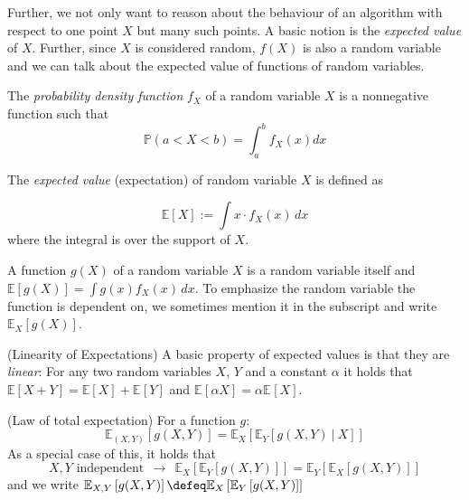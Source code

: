 \documentclass[
    a4paper, %
	fontsize=10pt, %
	twoside=false, %
]{kaobook}
\begin{document}
Further, we not only want to reason about the behaviour of an algorithm with respect to one point $X$ but many such points. A basic notion is the \textit{expected value} of $X$. Further, since $X$ is considered random, $f(X)$ is also a random variable and we can talk about the expected value of functions of random variables.
\begin{definition}
  The \textit{probability density function} $f_X$ of a random variable $X$ is a
  nonnegative function such that
  $$
  \mathbb{P}(a < X < b) = \int_a^b f_X(x) dx
  $$
\end{definition} 

\begin{definition}
  The \textit{expected value} (expectation) of random variable \(X\) is
  defined as
  
  \[ \mathbb{E}[X] := \int x \cdot
    f_X(x) \, dx
  \]
  where the integral is over the support of $X$. 
\end{definition}

  A function \(g(X)\) of a random variable \(X\) is a random variable itself and $\mathbb{E}[g(X)] = {\int g(x)f_X(x) \, dx}$. %
To emphasize the random
  variable the function is dependent on, we sometimes mention it in the
  subscript and write $\mathbb{E}_X[g(X)]$.

\begin{lemma} (Linearity of Expectations)
	A basic property of expected values is that they are \textit{linear}: For any two random variables $X$, $Y$ and a constant $\alpha$ it holds that $\mathbb{E}\left[ X + Y \right] = \mathbb{E}\left[ X \right] + \mathbb{E}_{}\left[ Y \right]$ and $\mathbb{E}_{}\left[ \alpha X \right] = \alpha \mathbb{E}_{}\left[ X \right]$.
\end{lemma}

\begin{lemma} (Law of total expectation)
  For a function $g$:
$$
\mathbb{E}_{(X,Y)}\left[ g(X,Y) \right] = \mathbb{E}_{X}\left[ \mathbb{E}_{Y}\left[ g(X,Y) ~|~ X \right]  \right] 
$$
As a special case of this, it holds that
$$
\text{$X,Y$ independent} ~ ~ \rightarrow ~ ~ 
\mathbb{E}_{X}\left[ \mathbb{E}_{Y}\left[ g(X,Y)  \right]  \right] 
=
\mathbb{E}_{Y}\left[ \mathbb{E}_{X}\left[ g(X,Y) \right]  \right] 
$$
and we write $\mathbb{E}_{X,Y}\left[ g(X,Y) \right] \defeq \mathbb{E}_{X}\left[ \mathbb{E}_{Y}\left[ g(X,Y) \right] \right]$
\end{lemma}
\end{document}
